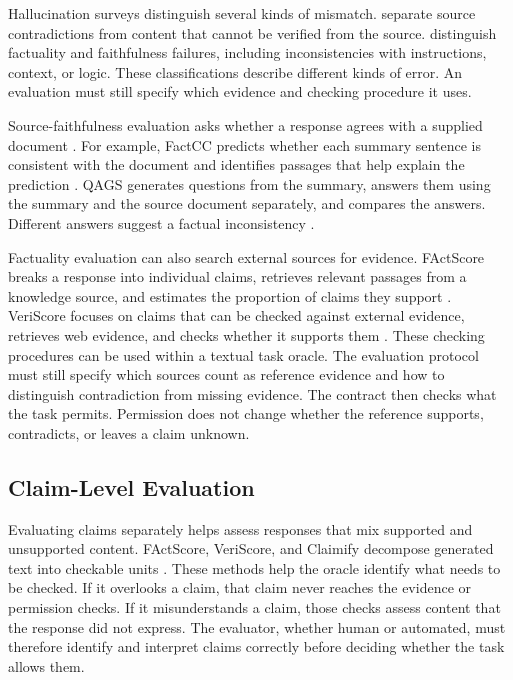 \documentclass{clv2025}
\begin{document}
Hallucination surveys distinguish several kinds of mismatch.
\citet{ji_survey_2023} separate source contradictions from content that cannot
be verified from the source. \citet{huang_survey_2025} distinguish factuality
and faithfulness failures, including inconsistencies with instructions,
context, or logic. These classifications describe different kinds of error.
An evaluation must still specify which evidence and checking procedure it uses.

Source-faithfulness evaluation asks whether a response agrees with a supplied
document \citep{maynez_faithfulness_2020}. For example, FactCC predicts whether
each summary sentence is consistent with the document and identifies
passages that help explain the prediction \citep{kryscinski_evaluating_2020}.
QAGS generates questions from the summary, answers them using the summary
and the source document separately, and compares the answers. Different
answers suggest a factual inconsistency \citep{wang_asking_2020}.

Factuality evaluation can also search external sources for evidence.
FActScore breaks a response into individual claims, retrieves relevant
passages from a knowledge source, and estimates the proportion of claims
they support \citep{min_factscore_2023}. VeriScore focuses on claims that
can be checked against external evidence, retrieves web evidence, and
checks whether it supports them \citep{song_veriscore_2024}.
These checking procedures can be used within a textual task oracle.
The evaluation protocol must still specify which sources count as reference
evidence and how to distinguish contradiction from missing evidence.
The contract then checks what the task permits. Permission does not change
whether the reference supports, contradicts, or leaves a claim unknown.

\subsection{Claim-Level Evaluation}\label{subsec:extraction}

Evaluating claims separately helps assess responses that mix supported and
unsupported content.
FActScore, VeriScore, and Claimify decompose generated text into checkable units
\citep{min_factscore_2023,song_veriscore_2024,metropolitansky_claimify_2025}.
These methods help the oracle identify what needs to be checked. If it
overlooks a claim, that claim never reaches the evidence or permission
checks. If it misunderstands a claim, those checks assess content that the
response did not express. The evaluator, whether human or automated, must therefore identify and
interpret claims correctly before deciding whether the task allows them.
\end{document}
